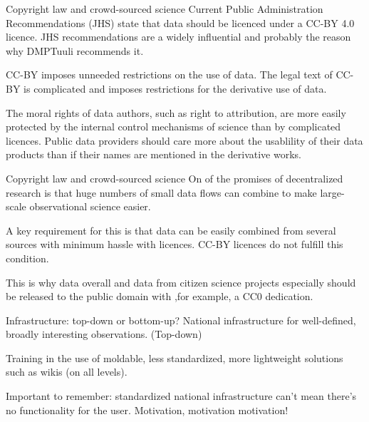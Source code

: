 \documentclass{beamer}
\begin{document}
\begin{frame}{Copyright law and crowd-sourced science}
  Current Public Administration Recommendations (JHS) state that data should be licenced under a CC-BY 4.0 licence. JHS recommendations are a widely influential and probably the reason why DMPTuuli recommends it.

  CC-BY imposes unneeded restrictions on the use of data. The legal text of CC-BY is complicated and imposes restrictions for the derivative use of data.

  The moral rights of data authors, such as right to attribution, are more easily protected by the internal control mechanisms of science than by complicated licences. Public data providers should care more about the usablility of their data products than if their names are mentioned in the derivative works.
\end{frame}


\begin{frame}{Copyright law and crowd-sourced science}
  On of the promises of decentralized research is that huge numbers of small data flows can combine to make large-scale observational science easier.

  A key requirement for this is that data can be easily combined from several sources with minimum hassle with licences. CC-BY licences do not fulfill this condition.

  This is why data overall and data from citizen science projects especially should be released to the public domain with ,for example, a CC0 dedication.
\end{frame}


\begin{frame}{Infrastructure: top-down or bottom-up?}
  National infrastructure for well-defined, broadly interesting observations. (Top-down)
  
  Training in the use of moldable, less standardized, more lightweight solutions such as wikis (on all levels).

  Important to remember: standardized national infrastructure can't mean there's no functionality for the user. Motivation, motivation motivation!
\end{frame}
\end{document}
